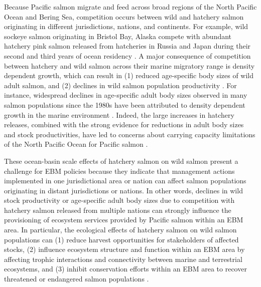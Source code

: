 Because Pacific salmon migrate and feed across broad regions of the North
Pacific Ocean and Bering Sea, competition occurs between wild and hatchery
salmon originating in different jurisdictions, nations, and continents. For
example, wild sockeye salmon originating in Bristol Bay, Alaska compete with
abundant hatchery pink salmon released from hatcheries in Russia and Japan
during their second and third years of ocean residency \citep{Ruggerone2003a}. A
major consequence of competition between hatchery and wild salmon across their
marine migratory range is density dependent growth, which can result in (1)
reduced age-specific body sizes of wild adult salmon, and (2) declines in wild
salmon population productivity \citep{Ruggerone2015, Ruggerone2003a}. For
instance, widespread declines in age-specific adult body sizes observed in many
salmon populations since the 1980s have been attributed to density dependent
growth in the marine environment \citep{Ricker1981a, Ishida1993a, Pyper1999a}.
Indeed, the large increases in hatchery releases, combined with the strong
evidence for reductions in adult body sizes and stock productivities, have led
to concerns about carrying capacity limitations of the North Pacific Ocean for
Pacific salmon \citep{Pearcy1999a, Nielsen2009a}.

These ocean-basin scale effects of hatchery salmon on wild salmon present a
challenge for EBM policies because they indicate that management actions
implemented in one jurisdictional area or nation can affect salmon populations
originating in distant jurisdictions or nations. In other words, declines in
wild stock productivity or age-specific adult body sizes due to competition with
hatchery salmon released from multiple nations can strongly influence the
provisioning of ecosystem services provided by Pacific salmon within an EBM
area. In particular, the ecological effects of hatchery salmon on wild salmon
populations can (1) reduce harvest opportunities for stakeholders of affected
stocks, (2) influence ecosystem structure and function within an EBM area by
affecting trophic interactions and connectivity between marine and terrestrial
ecosystems, and (3) inhibit conservation efforts within an EBM area to recover
threatened or endangered salmon populations \citep{Ruggerone2003a,
Nielsen2009a}.

